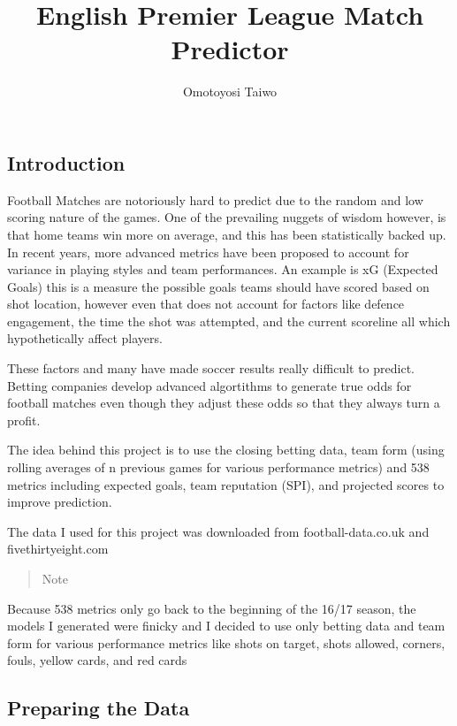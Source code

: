 \documentclass[
]{article}
\title{English Premier League Match Predictor}
\author{Omotoyosi Taiwo}
\date{}
\begin{document}
\maketitle

\hypertarget{introduction}{%
\subsection{Introduction}\label{introduction}}

Football Matches are notoriously hard to predict due to the random and
low scoring nature of the games. One of the prevailing nuggets of wisdom
however, is that home teams win more on average, and this has been
statistically backed up. In recent years, more advanced metrics have
been proposed to account for variance in playing styles and team
performances. An example is xG (Expected Goals) this is a measure the
possible goals teams should have scored based on shot location, however
even that does not account for factors like defence engagement, the time
the shot was attempted, and the current scoreline all which
hypothetically affect players.

These factors and many have made soccer results really difficult to
predict. Betting companies develop advanced algortithms to generate true
odds for football matches even though they adjust these odds so that
they always turn a profit.

The idea behind this project is to use the closing betting data, team
form (using rolling averages of n previous games for various performance
metrics) and 538 metrics including expected goals, team reputation
(SPI), and projected scores to improve prediction.

The data I used for this project was downloaded from football-data.co.uk
and fivethirtyeight.com

\begin{quote}
Note
\end{quote}

Because 538 metrics only go back to the beginning of the 16/17 season,
the models I generated were finicky and I decided to use only betting
data and team form for various performance metrics like shots on target,
shots allowed, corners, fouls, yellow cards, and red cards

\hypertarget{preparing-the-data}{%
\subsection{Preparing the Data}\label{preparing-the-data}}
\end{document}
